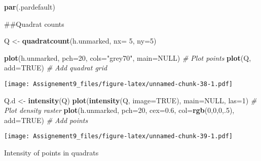\documentclass[]{article}
\newenvironment{Shaded}{\begin{snugshade}}{\end{snugshade}}
\newcommand{\CommentTok}[1]{\textcolor[rgb]{0.56,0.35,0.01}{\textit{#1}}}
\newcommand{\DataTypeTok}[1]{\textcolor[rgb]{0.13,0.29,0.53}{#1}}
\newcommand{\DecValTok}[1]{\textcolor[rgb]{0.00,0.00,0.81}{#1}}
\newcommand{\FloatTok}[1]{\textcolor[rgb]{0.00,0.00,0.81}{#1}}
\newcommand{\KeywordTok}[1]{\textcolor[rgb]{0.13,0.29,0.53}{\textbf{#1}}}
\newcommand{\NormalTok}[1]{#1}
\newcommand{\OtherTok}[1]{\textcolor[rgb]{0.56,0.35,0.01}{#1}}
\newcommand{\StringTok}[1]{\textcolor[rgb]{0.31,0.60,0.02}{#1}}
\begin{document}
\begin{Shaded}
\begin{Highlighting}[]
\KeywordTok{par}\NormalTok{(.pardefault)}
\end{Highlighting}
\end{Shaded}

\#\#Quadrat counts

\begin{Shaded}
\begin{Highlighting}[]
\NormalTok{Q <-}\StringTok{ }\KeywordTok{quadratcount}\NormalTok{(h.unmarked, }\DataTypeTok{nx=} \DecValTok{5}\NormalTok{, }\DataTypeTok{ny=}\DecValTok{5}\NormalTok{)}
\end{Highlighting}
\end{Shaded}

\begin{Shaded}
\begin{Highlighting}[]
\KeywordTok{plot}\NormalTok{(h.unmarked, }\DataTypeTok{pch=}\DecValTok{20}\NormalTok{, }\DataTypeTok{cols=}\StringTok{"grey70"}\NormalTok{, }\DataTypeTok{main=}\OtherTok{NULL}\NormalTok{)  }\CommentTok{# Plot points}
\KeywordTok{plot}\NormalTok{(Q, }\DataTypeTok{add=}\OtherTok{TRUE}\NormalTok{)  }\CommentTok{# Add quadrat grid}
\end{Highlighting}
\end{Shaded}

\texttt{[image: Assignement9\_files/figure-latex/unnamed-chunk-38-1.pdf]}

\begin{Shaded}
\begin{Highlighting}[]
\NormalTok{Q.d <-}\StringTok{ }\KeywordTok{intensity}\NormalTok{(Q)}
\KeywordTok{plot}\NormalTok{(}\KeywordTok{intensity}\NormalTok{(Q, }\DataTypeTok{image=}\OtherTok{TRUE}\NormalTok{), }\DataTypeTok{main=}\OtherTok{NULL}\NormalTok{, }\DataTypeTok{las=}\DecValTok{1}\NormalTok{)  }\CommentTok{# Plot density raster}
\KeywordTok{plot}\NormalTok{(h.unmarked, }\DataTypeTok{pch=}\DecValTok{20}\NormalTok{, }\DataTypeTok{cex=}\FloatTok{0.6}\NormalTok{, }\DataTypeTok{col=}\KeywordTok{rgb}\NormalTok{(}\DecValTok{0}\NormalTok{,}\DecValTok{0}\NormalTok{,}\DecValTok{0}\NormalTok{,.}\DecValTok{5}\NormalTok{), }\DataTypeTok{add=}\OtherTok{TRUE}\NormalTok{)  }\CommentTok{# Add points}
\end{Highlighting}
\end{Shaded}

\texttt{[image: Assignement9\_files/figure-latex/unnamed-chunk-39-1.pdf]}

Intensity of points in quadrats
\end{document}
